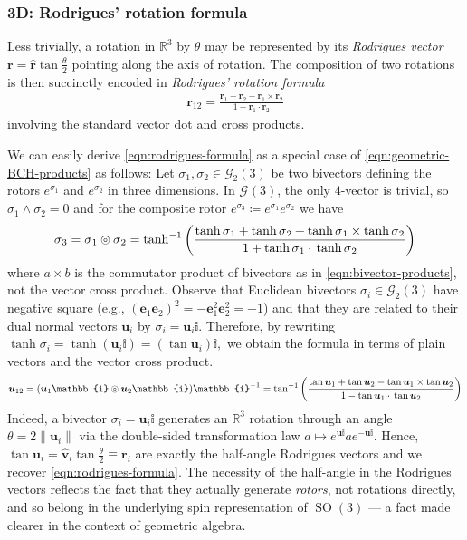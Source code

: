 \documentclass[12pt,a4paper]{article}
\renewcommand{\vb}[1]{\boldsymbol{#1}}
\newcommand{\ve}[1]{\vb{e}_{#1}}
\newcommand{\GA}[1][]{\mathcal{G}_{#1}}
\newcommand{\vol}{\mathbb{i}}
\newcommand{\RR}{\mathds{R}}
\DeclareMathOperator{\SO}{SO}
\newcommand{\bch}[2]{#1 \circledcirc #2}
\begin{document}
\subsubsection{3D: Rodrigues' rotation formula}

Less trivially, a rotation in $\RR^3$ by $\theta$ may be represented by its \emph{Rodrigues vector} $\vb r = \vb{\hat{r}}\tan\frac\theta2$ pointing along the axis of rotation.
The composition of two rotations is then succinctly encoded in \emph{Rodrigues' rotation formula}
\begin{align}
	\vb r_{12} = \frac{\vb r_1 + \vb r_2 - \vb r_1 \times{} \vb r_2}{1 - \vb r_1 \cdot{} \vb r_2}
	\label{eqn:rodrigues-formula}
\end{align}
involving the standard vector dot and cross products.

We can easily derive \eqref{eqn:rodrigues-formula} as a special case of \eqref{eqn:geometric-BCH-products} as follows:
Let $\sigma{}_1, \sigma{}_2 \in \GA[2](3)$ be two bivectors defining the rotors $e^{\sigma{}_1}$ and $e^{\sigma{}_2}$ in three dimensions.
In $\GA(3)$, the only $4$-vector is trivial, so $\sigma{}_1 \wedge{} \sigma{}_2 = 0$ and for the composite rotor $e^{\sigma{}_3} \coloneqq e^{\sigma{}_1}e^{\sigma{}_2}$ we have
\begin{align}
	\sigma{}_3 = \bch{\sigma{}_1}{\sigma{}_2} = \tanh^{-1}\qty(\frac{
	\tanh \sigma{}_1 + \tanh \sigma{}_2 + \tanh \sigma{}_1 \times \tanh \sigma{}_2
	}{
	1 + \tanh \sigma{}_1 \cdot{} \tanh \sigma{}_2
	})
\end{align}
where $a \times{} b$ is the commutator product of bivectors as in \eqref{eqn:bivector-products}, not the vector cross product.
Observe that Euclidean bivectors $\sigma{}_i \in{} \GA[2](3)$ have negative square (e.g., $(\ve1\ve2)^2 = -\ve1^2\ve2^2 = -1$) and that they are related to their dual normal vectors $\vb{u}_i$ by $\sigma{}_i = \vb{u}_i\vol$.
Therefore, by rewriting
\begin{math}
	\tanh \sigma{}_i
	= \tanh (\vb{u}_i\vol)
	= (\tan \vb{u}_i)\vol
,\end{math}
we obtain the formula in terms of plain vectors and the vector cross product.
\begin{align}
	\vb{u}_{12} = (\bch{\vb{u}_1\vol}{\vb{u}_2\vol})\vol^{-1}
	= \tan^{-1}\qty(\frac{
	\tan \vb{u}_1 + \tan \vb{u}_2 - \tan \vb{u}_1 \times \tan \vb{u}_2
	}{
	1 - \tan \vb{u}_1 \cdot{} \tan \vb{u}_2
	})
\end{align}
Indeed, a bivector $\sigma{}_i = \vb{u}_i\vol$ generates an $\RR^3$ rotation through an angle $\theta = 2\|\vb{u}_i\|$ via the double-sided transformation law
\begin{math}
	a \mapsto e^{\vb{u}\vol}ae^{-\vb{u}\vol}
.\end{math}
Hence, $\tan \vb{u}_i = \vb{\hat{v}}_i\tan\frac\theta2 \equiv{} \vb{r}_i$ are exactly the half-angle Rodrigues vectors and we recover \eqref{eqn:rodrigues-formula}.
The necessity of the half-angle in the Rodrigues vectors reflects the fact that they actually generate \emph{rotors}, not rotations directly, and so belong in the underlying spin representation of $\SO(3)$ --- a fact made clearer in the context of geometric algebra.
\end{document}
